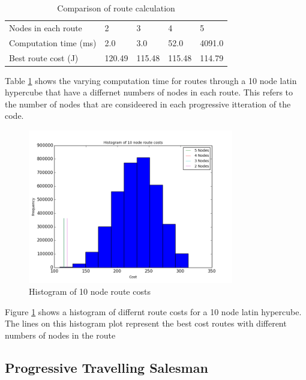 \documentclass[a4paper,12pt,twoside]{article}
\begin{document}
\begin{table}[width=\textwidth]
\centering
    \begin{tabular}{lllll}
    Nodes in each route	& 2	& 3	& 4	& 5	\\
Computation time (ms)	& 2.0	& 3.0	& 52.0	& 4091.0	\\
Best route cost (J)	& 120.49	& 115.48	& 115.48	& 114.79	\\

    \end{tabular}
\caption{Comparison of route calculation}
\label{tbl:comparison_of_route_calculation}
\end{table}

Table \ref{tbl:comparison_of_route_calculation} shows the varying computation time for routes through a 10 node latin hypercube that have a differnet numbers of nodes in each route. This refers to the number of nodes that are consideered in each progressive itteration of the code.

\begin{figure}[H]
\centering
\includegraphics[width=0.8\textwidth]{figures/histogram_of_10_node_route_costs.png} 
\caption{Histogram of 10 node route costs}
\label{fig:histogram_of_10_node_route_costs}
\end{figure}

Figure \ref{fig:histogram_of_10_node_route_costs} shows a histogram of differnt route costs for a 10 node latin hypercube. The lines on this histogram plot represent the best cost routes with different numbers of nodes in the route

\subsection{Progressive Travelling Salesman}
\label{sec:progressive_travelling_salesman}
\end{document}
